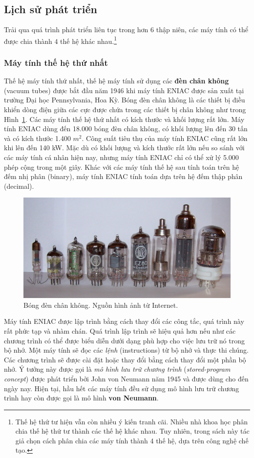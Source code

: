 \subsection{Lịch sử phát triển}
Trải qua quá trình phát triển liên tục trong hơn 6 thập niên, các máy tính có thể được chia thành 4 thế hệ khác nhau.\footnote{Thế hệ thứ tư hiện vẫn còn nhiều ý kiến tranh cãi. Nhiều nhà khoa học phân chia thế hệ thứ tư thành các thế hệ khác nhau. Tuy nhiên, trong sách này tác giả chọn cách phân chia các máy tính thành 4 thế hệ, dựa trên công nghệ chế tạo.}
\subsubsection{Máy tính thế hệ thứ nhất}
Thế hệ máy tính thứ nhất, thế hệ máy tính sử dụng các \textbf{đèn chân không} (vacuum tubes) được bắt đầu năm 1946 khi máy tính ENIAC được sản xuất tại trường Đại học Pennsylvania, Hoa Kỳ. Bóng đèn chân không là các thiết bị điều khiển dòng điện giữa các cực được chứa trong các thiết bị chân không như trong Hình~\ref{fig:vacuumTube}. Các máy tính thế hệ thứ nhất có kích thước và khối lượng rất lớn. Máy tính ENIAC dùng đến 18.000 bóng đèn chân không, có khối lượng lên đến 30 tấn và có kích thước 1.400 $m^2$. Công suất tiêu thụ của máy tính ENIAC cũng rất lớn khi lên đến 140 kW. Mặc dù có khối lượng và kích thước rất lớn nếu so sánh với các máy tính cá nhân hiện nay, nhưng máy tính ENIAC chỉ có thể xử lý 5.000 phép cộng trong một giây. Khác với các máy tính thế hệ sau tính toán trên hệ đếm nhị phân (binary), máy tính ENIAC tính toán dựa trên hệ đếm thập phân (decimal).

\begin{figure}[h]
	\centering
		\includegraphics[width=0.7\columnwidth]{chapter01/figure/VacuumTube.jpg}
		\centering
	\caption{Bóng đèn chân không. Nguồn hình ảnh từ Internet.}
	\label{fig:vacuumTube}
\end{figure}

Máy tính ENIAC được lập trình bằng cách thay đổi các công tắc, quá trình này rất phức tạp và nhàm chán. Quá trình lập trình sẽ hiệu quả hơn nếu như các chương trình có thể được biểu diễn dưới dạng phù hợp cho việc lưu trữ nó trong bộ nhớ. Một máy tính sẽ đọc các \emph{lệnh} (instructions) từ bộ nhớ và thực thi chúng. Các chương trình sẽ được cài đặt hoặc thay đổi bằng cách thay đổi một phần bộ nhớ. Ý tưởng này được gọi là \emph{mô hình lưu trữ chương trình} (\emph{stored-program concept}) được phát triển bởi John von Neumann năm 1945 và được dùng cho đến ngày nay. Hiện tại, hầu hết các máy tính đều sử dụng mô hình lưu trữ chương trình hay còn được gọi là mô hình \textbf{von Neumann}.


